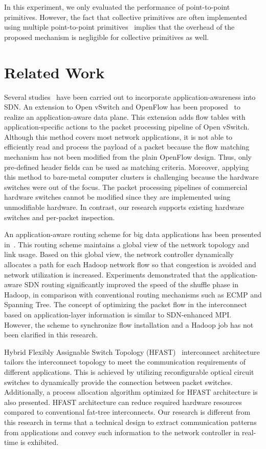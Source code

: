 In this experiment, we only evaluated the performance of point-to-point
primitives. However, the fact that collective primitives are often
implemented using multiple point-to-point
primitives~\autocites{Squyres2005}{mvapich} implies that the overhead
of the proposed mechanism is negligible for collective primitives as
well.

\section{Related Work}\label{sec:iv-related-work}

Several studies~\autocites{Mekky2014}{Cheng2014} have been carried out
to incorporate application-awareness into SDN\@. An extension to Open
vSwitch and OpenFlow has been proposed~\autocite{Mekky2014} to realize
an application-aware data plane. This extension adds flow tables with
application-specific actions to the packet processing pipeline of Open
vSwitch. Although this method covers most network applications, it is
not able to efficiently read and process the payload of a packet because
the flow matching mechanism has not been modified from the plain
OpenFlow design. Thus, only pre-defined header fields can be used as
matching criteria. Moreover, applying this method to bare-metal computer
clusters is challenging because the hardware switches were out of the
focus. The packet processing pipelines of commercial hardware switches
cannot be modified since they are implemented using unmodifiable
hardware. In contrast, our research supports existing hardware switches
and per-packet inspection.

An application-aware routing scheme for big data applications has been
presented in~\autocite{Cheng2014}. This routing scheme maintains a
global view of the network topology and link usage. Based on this global
view, the network controller dynamically allocates a path for each
Hadoop network flow so that congestion is avoided and network
utilization is increased. Experiments demonstrated that the
application-aware SDN routing significantly improved the speed of the
shuffle phase in Hadoop, in comparison with conventional routing
mechanisms such as ECMP and Spanning Tree. The concept of optimizing the
packet flow in the interconnect based on application-layer information
is similar to SDN-enhanced MPI\@. However, the scheme to synchronize flow
installation and a Hadoop job has not been clarified in this research.

Hybrid Flexibly Assignable Switch Topology (HFAST)~\autocite{Kamil2007}
interconnect architecture tailors the interconnect topology to meet the
communication requirements of different applications. This is achieved
by utilizing reconfigurable optical circuit switches to dynamically
provide the connection between packet switches. Additionally, a process
allocation algorithm optimized for HFAST architecture is also presented.
HFAST architecture can reduce required hardware resources compared to
conventional fat-tree interconnects. Our research is different from this
research in terms that a technical design to extract communication
patterns from applications and convey such information to the network
controller in real-time is exhibited.

